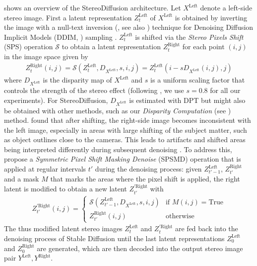  shows an overview of the StereoDiffusion architecture. Let $X^\text{Left}$ denote a left-side stereo image. First a latent representation $Z_t^\text{Left}$ of $X^\text{Left}$ is obtained by inverting the image with a null-text inversion (\cite{mokady2023null}, see also ) technique for Denoising Diffusion Implicit Models (DDIM, \cite{song2020denoising}) sampling \citep{Wang-2024-stereodiffusion}. $Z_t^\text{Left}$ is shifted via the \emph{Stereo Pixels Shift} (SPS) operation $\mathcal{S}$ to obtain a latent representation $Z_t^\text{Right}$ for each point $(i,j)$ in the image space given by 
\begin{align}\label{eq:sps}
    Z_t^\text{Right}(i,j)=\mathcal{S}(Z_t^\text{Left},D_{X^\text{Left}},s,i,j)=Z_t^\text{Left}(i-sD_{X^\text{Left}}(i,j),j)
\end{align}
where $D_{X^\text{Left}}$ is the disparity map of $X^\text{Left}$ and $s$ is a uniform scaling factor that controls the strength of the stereo effect (following \cite{Wang-2024-stereodiffusion}, we use $s=0.8$ for all our experiments). For StereoDiffusion, $D_{X^\text{Left}}$ is estimated with DPT \citep{ranftl2021visiontransformersdenseprediction} but might also be obtained with other methods, such as our \emph{Disparity Computation} (see ) method. \cite{Wang-2024-stereodiffusion} found that after shifting, the right-side image becomes inconsistent with the left image, especially in areas with large shifting of the subject matter, such as object outlines close to the cameras. This leads to artifacts and shifted areas being interpreted differently during subsequent denoising \citep{Wang-2024-stereodiffusion}. To address this, \cite{Wang-2024-stereodiffusion} propose a \emph{Symmetric Pixel Shift Masking Denoise} (SPSMD) operation that is applied at regular intervals $t'$ during the denoising process: given $Z_{t'-1}^\text{Left}$, $Z_{t'}^\text{Right}$ and a mask $M$ that marks the areas where the pixel shift is applied, the right latent is modified to obtain a new latent $Z_{t'}^{'\text{Right}}$ with
\begin{align}\label{eq:spsmd}
    Z_{t'}^{'\text{Right}}(i,j) = 
    \begin{cases}
        \mathcal{S}(Z_{t'-1}^\text{Left},D_{X^\text{Left}},s,i,j) &\text{if }M(i,j)=\text{True}\\
        Z_{t'}^\text{Right}(i,j) &\text{otherwise}
    \end{cases}
\end{align}
The thus modified latent stereo images $Z_{t}^\text{Left}$ and $Z_{t}^{'\text{Right}}$ are fed back into the denoising process of Stable Diffusion until the last latent representations $Z_0^\text{Left}$ and $Z_0^\text{Right}$ are generated, which are then decoded into the output stereo image pair $Y^\text{Left},Y^\text{Right}$.

